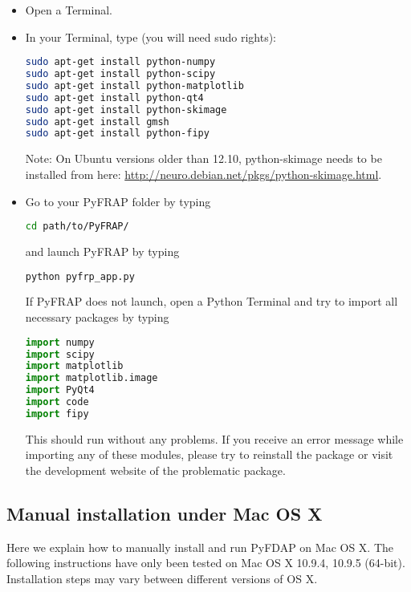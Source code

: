 \documentclass[a4paper,11pt]{article}
\begin{document}
\begin{itemize}
 \item Open a Terminal.
 \item In your Terminal, type (you will need sudo rights):
 \begin{lstlisting}[frame=single,language=bash]  
sudo apt-get install python-numpy
sudo apt-get install python-scipy
sudo apt-get install python-matplotlib
sudo apt-get install python-qt4
sudo apt-get install python-skimage
sudo apt-get install gmsh
sudo apt-get install python-fipy
\end{lstlisting}
Note: On Ubuntu versions older than 12.10, python-skimage needs to be installed from here: \url{http://neuro.debian.net/pkgs/python-skimage.html}.
 \item Go to your PyFRAP folder by typing 
\begin{lstlisting}[frame=single,language=bash]  
cd path/to/PyFRAP/
\end{lstlisting}
and launch PyFRAP by typing
\begin{lstlisting}[frame=single,language=bash]  
python pyfrp_app.py
\end{lstlisting}
If PyFRAP does not launch, open a Python Terminal and try to import all necessary packages by typing
\begin{lstlisting}[frame=single,language=Python]  
import numpy
import scipy
import matplotlib
import matplotlib.image
import PyQt4
import code
import fipy
\end{lstlisting}
This should run without any problems. If you receive an error message while importing any of these modules, please try to reinstall the package or visit the development website of the problematic package.

\end{itemize}

\subsection{Manual installation under Mac OS X}
\label{sec:macos}
Here we explain how to  manually install and run PyFDAP on Mac OS X. The following instructions have only been tested on Mac OS X 10.9.4, 10.9.5 (64-bit). Installation steps may vary between different versions of OS X.
\end{document}
